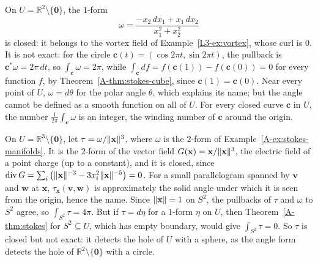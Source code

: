 \begin{example}\label{A-ex:angle-form}
    On $U = \mathbb{R}^2 \setminus \{\mathbf{0}\}$, the $1$-form
    \[\omega = \frac{-x_2\, dx_1 + x_1\, dx_2}{x_1^2 + x_2^2}\]
    is closed: it belongs to the vortex field of Example~\ref{L3-ex:vortex}, whose curl is $0$. It is not exact: for the circle $\mathbf{c}(t) = (\cos 2\pi t, \sin 2\pi t)$, the pullback is $\mathbf{c}^*\omega = 2\pi\, dt$, so $\int_{\mathbf{c}} \omega = 2\pi$, while $\int_{\mathbf{c}} df = f(\mathbf{c}(1)) - f(\mathbf{c}(0)) = 0$ for every function $f$, by Theorem~\ref{A-thm:stokes-cube}, since $\mathbf{c}(1) = \mathbf{c}(0)$. Near every point of $U$, $\omega = d\theta$ for the polar angle $\theta$, which explains its name; but the angle cannot be defined as a smooth function on all of $U$. For every closed curve $\mathbf{c}$ in $U$, the number $\frac{1}{2\pi}\int_{\mathbf{c}} \omega$ is an integer, the winding number of $\mathbf{c}$ around the origin.
\end{example}

\begin{example}\label{A-ex:solid-angle}
    On $U = \mathbb{R}^3 \setminus \{\mathbf{0}\}$, let $\tau = \omega/\lVert \mathbf{x} \rVert^3$, where $\omega$ is the $2$-form of Example~\ref{A-ex:stokes-manifolds}. It is the $2$-form of the vector field $G(\mathbf{x}) = \mathbf{x}/\lVert \mathbf{x} \rVert^3$, the electric field of a point charge (up to a constant), and it is closed, since $\operatorname{div} G = \sum_i \big(\lVert \mathbf{x} \rVert^{-3} - 3x_i^2\lVert \mathbf{x} \rVert^{-5}\big) = 0$. For a small parallelogram spanned by $\mathbf{v}$ and $\mathbf{w}$ at $\mathbf{x}$, $\tau_{\mathbf{x}}(\mathbf{v}, \mathbf{w})$ is approximately the solid angle under which it is seen from the origin, hence the name. Since $\lVert \mathbf{x} \rVert = 1$ on $S^2$, the pullbacks of $\tau$ and $\omega$ to $S^2$ agree, so $\int_{S^2} \tau = 4\pi$. But if $\tau = d\eta$ for a $1$-form $\eta$ on $U$, then Theorem~\ref{A-thm:stokes} for $S^2 \subseteq U$, which has empty boundary, would give $\int_{S^2} \tau = 0$. So $\tau$ is closed but not exact: it detects the hole of $U$ with a sphere, as the angle form detects the hole of $\mathbb{R}^2 \setminus \{\mathbf{0}\}$ with a circle.
\end{example}

